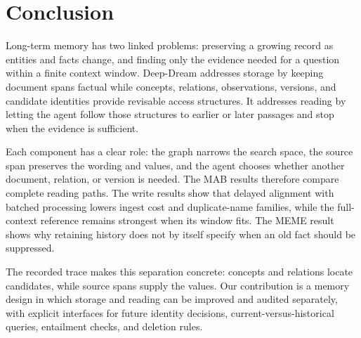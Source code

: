 \section{Conclusion}
\label{sec:conclusion}

Long-term memory has two linked problems: preserving a growing record as entities and facts change, and finding only the evidence needed for a question within a finite context window. Deep-Dream addresses storage by keeping document spans factual while concepts, relations, observations, versions, and candidate identities provide revisable access structures. It addresses reading by letting the agent follow those structures to earlier or later passages and stop when the evidence is sufficient.

Each component has a clear role: the graph narrows the search space, the source span preserves the wording and values, and the agent chooses whether another document, relation, or version is needed. The MAB results therefore compare complete reading paths. The write results show that delayed alignment with batched processing lowers ingest cost and duplicate-name families, while the full-context reference remains strongest when its window fits. The MEME result shows why retaining history does not by itself specify when an old fact should be suppressed.

The recorded trace makes this separation concrete: concepts and relations locate candidates, while source spans supply the values. Our contribution is a memory design in which storage and reading can be improved and audited separately, with explicit interfaces for future identity decisions, current-versus-historical queries, entailment checks, and deletion rules.
